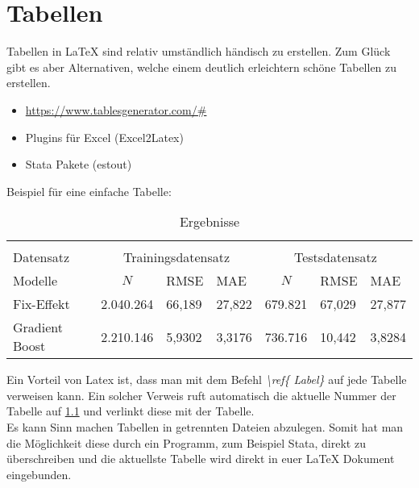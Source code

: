 \chapter{Tabellen}
Tabellen in LaTeX sind relativ umständlich händisch zu erstellen. Zum Glück gibt es aber Alternativen, welche einem deutlich erleichtern schöne Tabellen zu erstellen.
\begin{itemize}
    \item \url{https://www.tablesgenerator.com/#}
    \item Plugins für Excel (Excel2Latex)
    \item Stata Pakete (estout)
\end{itemize}

Beispiel für eine einfache Tabelle:
\begin{table}[h]
\centering
\caption{Ergebnisse}
\label{tab:easy_table}
\begin{tabular}{l|lll|lll}
\hline\hline \multicolumn{4}{l}{} \\ [-10pt]
Datensatz & \multicolumn{3}{c|}{Trainingsdatensatz} & \multicolumn{3}{c}{Testsdatensatz} \\
Modelle &                \multicolumn{1}{c}{ $N$} &     RMSE &      MAE &           \multicolumn{1}{c}{ $N$}&      RMSE &      MAE \\
\midrule
Fix-Effekt              &           2.040.264 & 66,189     &     27,822 &    679.821 & 67,029 & 27,877 \\
Gradient Boost    &           2.210.146 & 5,9302     &     3,3176 &    736.716 & 10,442 &  3,8284 \\
\hline\hline 
\end{tabular}

\end{table}

Ein Vorteil von Latex ist, dass man mit dem Befehl \emph{ \textbackslash ref\{ Label\} } auf jede Tabelle verweisen kann. Ein solcher Verweis ruft automatisch die aktuelle Nummer der Tabelle auf \ref{tab:easy_table} und verlinkt diese mit der Tabelle.\\
Es kann Sinn machen Tabellen in getrennten Dateien abzulegen. Somit hat man die Möglichkeit diese durch ein Programm, zum Beispiel Stata, direkt zu überschreiben und die aktuellste Tabelle wird direkt in euer LaTeX Dokument eingebunden.